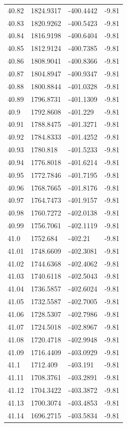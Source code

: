 \begin{table}[H]
\begin{tabular}{llll}
40.82 & 1824.9317 & -400.4442 & -9.81 \\
40.83 & 1820.9262 & -400.5423 & -9.81 \\
40.84 & 1816.9198 & -400.6404 & -9.81 \\
40.85 & 1812.9124 & -400.7385 & -9.81 \\
40.86 & 1808.9041 & -400.8366 & -9.81 \\
40.87 & 1804.8947 & -400.9347 & -9.81 \\
40.88 & 1800.8844 & -401.0328 & -9.81 \\
40.89 & 1796.8731 & -401.1309 & -9.81 \\
40.9 & 1792.8608 & -401.229 & -9.81 \\
40.91 & 1788.8475 & -401.3271 & -9.81 \\
40.92 & 1784.8333 & -401.4252 & -9.81 \\
40.93 & 1780.818 & -401.5233 & -9.81 \\
40.94 & 1776.8018 & -401.6214 & -9.81 \\
40.95 & 1772.7846 & -401.7195 & -9.81 \\
40.96 & 1768.7665 & -401.8176 & -9.81 \\
40.97 & 1764.7473 & -401.9157 & -9.81 \\
40.98 & 1760.7272 & -402.0138 & -9.81 \\
40.99 & 1756.7061 & -402.1119 & -9.81 \\
41.0 & 1752.684 & -402.21 & -9.81 \\
41.01 & 1748.6609 & -402.3081 & -9.81 \\
41.02 & 1744.6368 & -402.4062 & -9.81 \\
41.03 & 1740.6118 & -402.5043 & -9.81 \\
41.04 & 1736.5857 & -402.6024 & -9.81 \\
41.05 & 1732.5587 & -402.7005 & -9.81 \\
41.06 & 1728.5307 & -402.7986 & -9.81 \\
41.07 & 1724.5018 & -402.8967 & -9.81 \\
41.08 & 1720.4718 & -402.9948 & -9.81 \\
41.09 & 1716.4409 & -403.0929 & -9.81 \\
41.1 & 1712.409 & -403.191 & -9.81 \\
41.11 & 1708.3761 & -403.2891 & -9.81 \\
41.12 & 1704.3422 & -403.3872 & -9.81 \\
41.13 & 1700.3074 & -403.4853 & -9.81 \\
41.14 & 1696.2715 & -403.5834 & -9.81 \\

\end{tabular}
\end{table}

